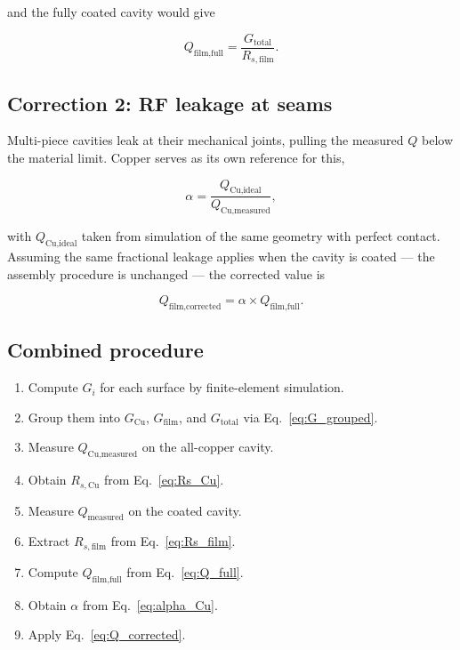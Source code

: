 and the fully coated cavity would give

\begin{equation}
Q_\text{film,full} = \frac{G_\text{total}}{R_{s,\text{film}}}.
\label{eq:Q_full}
\end{equation}

\subsection{Correction 2: RF leakage at seams}\label{sec:QRFleakage}

Multi-piece cavities leak at their mechanical joints, pulling the measured $Q$ below the material limit. Copper serves as its own reference for this,

\begin{equation}
\alpha = \frac{Q_\text{Cu,ideal}}{Q_\text{Cu,measured}},
\label{eq:alpha_Cu}
\end{equation}

with $Q_\text{Cu,ideal}$ taken from simulation of the same geometry with perfect contact. Assuming the same fractional leakage applies when the cavity is coated --- the assembly procedure is unchanged --- the corrected value is

\begin{equation}
Q_\text{film,corrected} = \alpha \times Q_\text{film,full}.
\label{eq:Q_corrected}
\end{equation}

\subsection{Combined procedure}

\begin{enumerate}
    \item Compute $G_i$ for each surface by finite-element simulation.
    \item Group them into $G_\text{Cu}$, $G_\text{film}$, and $G_\text{total}$ via Eq.~\ref{eq:G_grouped}.
    \item Measure $Q_\text{Cu,measured}$ on the all-copper cavity.
    \item Obtain $R_{s,\text{Cu}}$ from Eq.~\ref{eq:Rs_Cu}.
    \item Measure $Q_\text{measured}$ on the coated cavity.
    \item Extract $R_{s,\text{film}}$ from Eq.~\ref{eq:Rs_film}.
    \item Compute $Q_\text{film,full}$ from Eq.~\ref{eq:Q_full}.
    \item Obtain $\alpha$ from Eq.~\ref{eq:alpha_Cu}.
    \item Apply Eq.~\ref{eq:Q_corrected}.
\end{enumerate}


